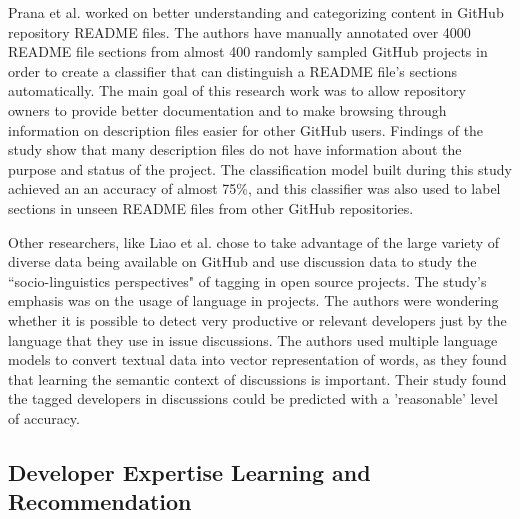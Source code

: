         Prana et al. \cite{prana2019categorizing} worked on better understanding and categorizing content in GitHub repository README files. The authors have manually annotated over 4000 README file sections from almost 400 randomly sampled GitHub projects in order to create a classifier that can distinguish a README file's sections automatically. The main goal of this research work was to allow repository owners to provide better documentation and to make browsing through information on description files easier for other GitHub users. Findings of the study show that many description files do not have information about the purpose and status of the project. The classification model built during this study achieved an an accuracy of almost 75\%, and this classifier was also used to label sections in unseen README files from other GitHub repositories.

        Other researchers, like Liao et al. \cite{liao2019status} chose to take advantage of the large variety of diverse data being available on GitHub and use discussion data to study the ``socio-linguistics perspectives" of tagging in open source projects. The study's emphasis was on the usage of language in projects. The authors were wondering whether it is possible to detect very productive or relevant developers just by the language that they use in issue discussions. The authors used multiple language models to convert textual data into vector representation of words, as they found that learning the semantic context of discussions is important. Their study found the tagged developers in discussions could be predicted with a 'reasonable' level of accuracy.

    \subsection{Developer Expertise Learning and Recommendation}
        
